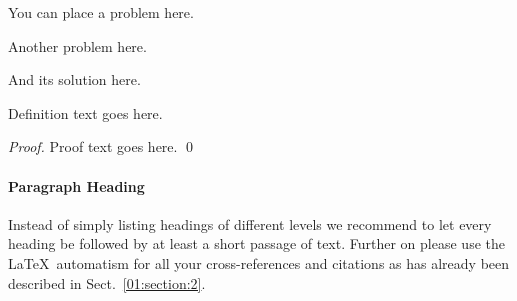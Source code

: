\begin{bibunit}
\begin{problem}
You can place a problem here.
\end{problem}

\begin{problem}{\nocaption}
Another problem here.
\end{problem}

\begin{solution}
And its solution here.
\end{solution}

\begin{definition}
Definition text goes here.
\end{definition}

\begin{proof}
Proof text goes here. \qed
\end{proof}


\paragraph{Paragraph Heading} %
Instead of simply listing headings of different levels we recommend to let every heading be followed by at least a short passage of text.  Further on please use the \LaTeX\ automatism for all your cross-references and citations as has already been described in Sect.~\ref{01:section:2}.


\end{bibunit}
